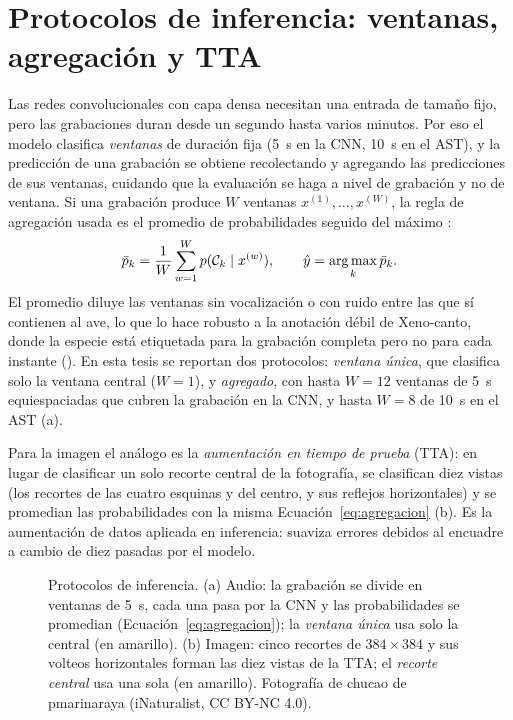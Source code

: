 \section{Protocolos de inferencia: ventanas, agregación y TTA}\label{sec:teoria-inferencia}

Las redes convolucionales con capa densa necesitan una entrada de tamaño
fijo, pero las grabaciones duran desde un segundo hasta varios minutos. Por
eso el modelo clasifica \emph{ventanas} de duración fija (\SI{5}{\second} en
la CNN, \SI{10}{\second} en el AST), y la predicción de una grabación se
obtiene recolectando y agregando las predicciones de sus ventanas, cuidando
que la evaluación se haga a nivel de grabación y no de ventana. Si una
grabación produce $W$ ventanas
$x^{(1)}, \dots, x^{(W)}$, la regla de agregación usada es el promedio de
probabilidades seguido del máximo \citep[pp.~26, 30]{virtanen2018casse}:
\begin{equation}
  \bar{p}_k = \frac{1}{W} \sum_{w=1}^{W} p(\mathcal{C}_k \mid x^{(w)}),
  \qquad \hat{y} = \operatorname*{arg\,max}_k \bar{p}_k.
  \label{eq:agregacion}
\end{equation}
El promedio diluye las ventanas sin vocalización o con ruido entre las que sí
contienen al ave, lo que lo hace robusto a la anotación débil de Xeno-canto,
donde la especie está etiquetada para la grabación completa pero no para
cada instante (). En esta tesis se reportan dos
protocolos: \emph{ventana única}, que clasifica solo la ventana central
($W = 1$), y \emph{agregado}, con hasta $W = 12$ ventanas de \SI{5}{\second}
equiespaciadas que cubren la grabación en la CNN, y hasta $W = 8$ de
\SI{10}{\second} en el AST (a).

Para la imagen el análogo es la \emph{aumentación en tiempo de prueba}
(TTA): en lugar de clasificar un solo recorte central de la fotografía, se
clasifican diez vistas (los recortes de las cuatro esquinas y del centro, y
sus reflejos horizontales) y se promedian las probabilidades con la misma
Ecuación~\ref{eq:agregacion} (b). Es la aumentación
de datos aplicada en inferencia: suaviza errores debidos al encuadre a cambio
de diez pasadas por el modelo.

\begin{figure}[!htb]
  \centering
  \caption{Protocolos de inferencia. (a) Audio: la grabación se divide en
  ventanas de \SI{5}{\second}, cada una pasa por la CNN y las probabilidades
  se promedian (Ecuación~\ref{eq:agregacion}); la \emph{ventana única} usa
  solo la central (en amarillo). (b) Imagen: cinco recortes de $384\times384$
  y sus volteos horizontales forman las diez vistas de la TTA; el
  \emph{recorte central} usa una sola (en amarillo). Fotografía de chucao de
  pmarinaraya (iNaturalist, CC BY-NC 4.0).}
  \label{fig:ventanas-tta}
\end{figure}

